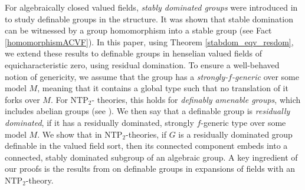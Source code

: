 \documentclass[12pt]{article}
\newcommand{\NTP}{\mathrm{NTP_2}}
\newcommand{\0}{\emptyset}
\theoremstyle{plain}%
\theoremstyle{definition}
\theoremstyle{remark}
\begin{document}
For algebraically closed valued fields, \textit{stably dominated groups} were introduced in \cite{HR19} to study definable groups in the structure. It was shown that stable domination can be witnessed by a group homomorphism into a stable group (see Fact \ref{homomorphismACVF}). In this paper, using Theorem \ref{stabdom_eqv_resdom}, we extend these results to definable groups in henselian valued fields of equicharacteristic zero, using residual domination. To ensure a well-behaved notion of genericity, we assume that the group has a \textit{strongly-$f$-generic} over some model $M$, meaning that it contains a global type such that no translation of it forks over $M$. For $\NTP$- theories, this holds for \emph{definably amenable groups}, which includes abelian groups (see \cite{MOS20}). We then say that a definable group is \textit{residually dominated}, if it has a residually dominated, strongly $f$-generic type over some model $M$.  We show that in $\NTP$-theories, if 
$G$ is a residually dominated group definable in the valued field sort, then its connected component embeds into a connected, stably dominated subgroup of an algebraic group. A key ingredient of our proofs is the results from \cite{MOS20} on definable groups in expansions of fields with an $\NTP$-theory.
\end{document}
